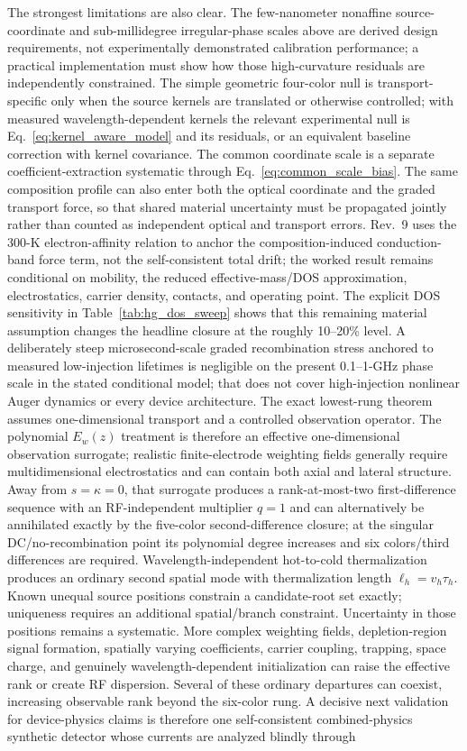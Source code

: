 \documentclass[11pt]{article}
\begin{document}
The strongest limitations are also clear. The few-nanometer nonaffine source-coordinate and sub-millidegree irregular-phase scales above are derived design requirements, not experimentally demonstrated calibration performance; a practical implementation must show how those high-curvature residuals are independently constrained. The simple geometric four-color null is transport-specific only when the source kernels are translated or otherwise controlled; with measured wavelength-dependent kernels the relevant experimental null is Eq.~\eqref{eq:kernel_aware_model} and its residuals, or an equivalent baseline correction with kernel covariance. The common coordinate scale is a separate coefficient-extraction systematic through Eq.~\eqref{eq:common_scale_bias}. The same composition profile can also enter both the optical coordinate and the graded transport force, so that shared material uncertainty must be propagated jointly rather than counted as independent optical and transport errors. Rev.~9 uses the 300-K electron-affinity relation \cite{RhigerMustafa2025} to anchor the composition-induced conduction-band force term, not the self-consistent total drift; the worked result remains conditional on mobility, the reduced effective-mass/DOS approximation, electrostatics, carrier density, contacts, and operating point. The explicit DOS sensitivity in Table~\ref{tab:hg_dos_sweep} shows that this remaining material assumption changes the headline closure at the roughly 10--20\% level. A deliberately steep microsecond-scale graded recombination stress anchored to measured low-injection lifetimes \cite{Kopytko2021} is negligible on the present 0.1--1-GHz phase scale in the stated conditional model; that does not cover high-injection nonlinear Auger dynamics or every device architecture. The exact lowest-rung theorem assumes one-dimensional transport and a controlled observation operator. The polynomial $E_w(z)$ treatment is therefore an effective one-dimensional observation surrogate; realistic finite-electrode weighting fields generally require multidimensional electrostatics and can contain both axial and lateral structure. Away from $s=\kappa=0$, that surrogate produces a rank-at-most-two first-difference sequence with an RF-independent multiplier $q=1$ and can alternatively be annihilated exactly by the five-color second-difference closure; at the singular DC/no-recombination point its polynomial degree increases and six colors/third differences are required. Wavelength-independent hot-to-cold thermalization produces an ordinary second spatial mode with thermalization length $\ell_h=v_h\tau_h$. Known unequal source positions constrain a candidate-root set exactly; uniqueness requires an additional spatial/branch constraint. Uncertainty in those positions remains a systematic. More complex weighting fields, depletion-region signal formation, spatially varying coefficients, carrier coupling, trapping, space charge, and genuinely wavelength-dependent initialization can raise the effective rank or create RF dispersion. Several of these ordinary departures can coexist, increasing observable rank beyond the six-color rung. A decisive next validation for device-physics claims is therefore one self-consistent combined-physics synthetic detector whose currents are analyzed blindly through 
\end{document}
